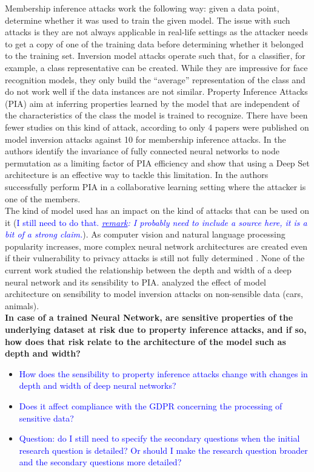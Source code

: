 \documentclass[11pt]{article}
\begin{document}
Membership inference attacks work the following way: given a data point, determine whether it was used to train the given model. The issue with such attacks is they are not always applicable in real-life settings as the attacker needs to get a copy of one of the training data before determining whether it belonged to the training set. Inversion model attacks operate such that, for a classifier, for example, a class representative can be created. While they are impressive for face recognition models, they only build the “average” representation of the class and do not work well if the data instances are not similar.
Property Inference Attacks (PIA) aim at inferring properties learned by the model that are independent of the characteristics of the class the model is trained to recognize. There have been fewer studies on this kind of attack, according to \citet{He2019} only 4 papers were published on model inversion attacks against 10 for membership inference attacks. In \cite{Ganju2018} the authors identify the invariance of fully connected neural networks to node permutation as a limiting factor of PIA efficiency and show that using a Deep Set architecture \cite{zaheer2017deep} is an effective way to tackle this limitation. In \cite{Melis2019} the authors successfully perform PIA in a collaborative learning setting where the attacker is one of the members.\\

The kind of model used has an impact on the kind of attacks that can be used on it (\textcolor{blue}{I still need to do that. \textit{\underline{remark}: I probably need to include a source here, it is a bit of a strong claim.}}). As computer vision and natural language processing popularity increases, more complex neural network architectures are created even if their vulnerability to privacy attacks is still not fully determined \cite{He2019}. None of the current work studied the relationship between the depth and width of a deep neural network and its sensibility to PIA. \citet{Geiping2020} analyzed the effect of model architecture on sensibility to model inversion attacks on non-sensible data (cars, animals).\\


\textbf{In case of a trained Neural Network, are sensitive properties of the underlying dataset at risk due to property inference attacks, and if so, how does that risk relate to the architecture of the model such as depth and width?}
\begin{itemize}
\item{\textcolor{blue}{How does the sensibility to property inference attacks change with changes in depth and width of deep neural networks?}}
\item{\textcolor{blue}{Does it affect compliance with the GDPR concerning the processing of sensitive data?}}
\item{\textcolor{blue}{Question: do I still need to specify the secondary questions when the initial research question is detailed? Or should I make the research question broader and the secondary questions more detailed?}}
\end{itemize}
\end{document}
